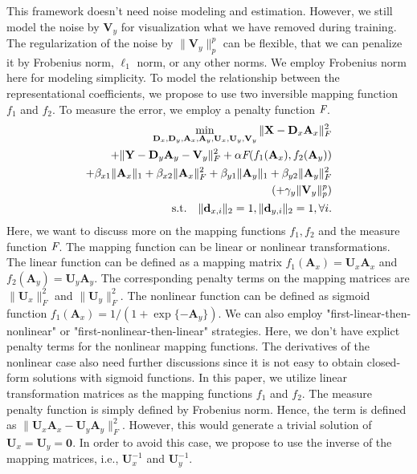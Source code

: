 \documentclass[10pt,twocolumn,letterpaper]{article}
\begin{document}
This framework doesn't need noise modeling and estimation. However, we still model the noise by $\mathbf{V}_{y}$ for visualization what we have removed during training. The regularization of the noise by $\|\mathbf{V}_{y}\|_{p}^{p}$ can be flexible, that we can penalize it by Frobenius norm, $\ell_{1}$ norm, or any other norms. We employ Frobenius norm here for modeling simplicity. To model the relationship between the representational coefficients, we propose to use two inversible mapping function $f_{1}$ and $f_{2}$. To measure the error, we employ a penalty function $\emph{F}$.
\begin{equation}
\begin{split}
\min_{\mathbf{D}_{x},\mathbf{D}_{y},\mathbf{A}_{x},\mathbf{A}_{y},\mathbf{U}_{x},\mathbf{U}_{y},\mathbf{V}_{y}}
\|\mathbf{X}-\mathbf{D}_{x}\mathbf{A}_{x}\|_{F}^{2}&
\\
+
\|\mathbf{Y}-\mathbf{D}_{y}\mathbf{A}_{y}-\mathbf{V}_{y}\|_{F}^{2}
+
\alpha
\emph{F}(f_{1}(\mathbf{A}_{x}),f_{2}(\mathbf{A}_{y}))&
\\
+
\beta_{x1}\|\mathbf{A}_{x}\|_{1}
+
\beta_{x2}\|\mathbf{A}_{x}\|_{F}^{2}
+
\beta_{y1}\|\mathbf{A}_{y}\|_{1}
+
\beta_{y2}\|\mathbf{A}_{y}\|_{F}^{2}
&
\\
(+
\gamma_{y}\|\mathbf{V}_{y}\|_{p}^{p})
\\
\text{s.t.}
\quad
\|\mathbf{d}_{x,i}\|_{2}=1
, 
\|\mathbf{d}_{y,i}\|_{2}=1
,
\forall{i}
.
\end{split}
\end{equation}
Here, we want to discuss more on the mapping functions $f_{1}, f_{2}$ and the measure function $\emph{F}$. The mapping function can be linear or nonlinear transformations. The linear function can be defined as a mapping matrix $f_{1}(\mathbf{A}_{x})=\mathbf{U}_{x}\mathbf{A}_{x}$ and $f_{2}(\mathbf{A}_{y})=\mathbf{U}_{y}\mathbf{A}_{y}$. The corresponding penalty terms on the mapping matrices are $\|\mathbf{U}_{x}\|_{F}^{2}$ and $\|\mathbf{U}_{y}\|_{F}^{2}$. The nonlinear function can be defined as sigmoid function $f_{1}(\mathbf{A}_{x})=1/(1+\exp\{-\mathbf{A}_{y}\})$. We can also employ "first-linear-then-nonlinear" or "first-nonlinear-then-linear" strategies. Here, we don't have explict penalty terms for the nonlinear mapping functions. The derivatives of the nonlinear case also need further discussions since it is not easy to obtain closed-form solutions with sigmoid functions. In this paper, we utilize linear transformation matrices as the mapping functions $f_{1}$ and $f_{2}$. The measure penalty function is simply defined by Frobenius norm. Hence, the term is defined as $\|\mathbf{U}_{x}\mathbf{A}_{x}-\mathbf{U}_{y}\mathbf{A}_{y}\|_{F}^{2}$. However, this would generate a trivial solution of $\mathbf{U}_{x}=\mathbf{U}_{y}=\mathbf{0}$. In order to avoid this case, we propose to use the inverse of the mapping matrices, i.e., $\mathbf{U}_{x}^{-1}$ and $\mathbf{U}_{y}^{-1}$.
\end{document}
